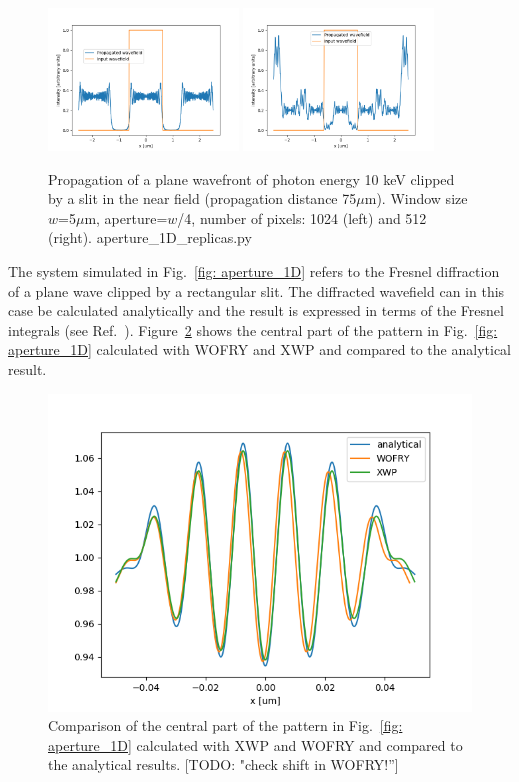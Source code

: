 \documentclass{iucr}              %
\newcommand{\todo}[1]{{\color{red}[TODO: "#1'']}}
\newcommand{\ingreen}[1]{{\color{green}#1}}
\begin{document}
\begin{figure}
\label{fig: aperture_1D_replica}
\caption{Propagation of a plane wavefront of photon energy 10 keV clipped by a slit in the near field (propagation distance 75$\mu$m). Window size $w$=5$\mu$m, aperture=$w$/4, number of pixels: 1024 (left) and 512 (right). \ingreen{aperture\_1D\_replicas.py}
}
\includegraphics[width=0.45\textwidth]{aperture_1D_over2.png}
\includegraphics[width=0.45\textwidth]{aperture_1D_over4.png}
\end{figure}


The system simulated in Fig.~\ref{fig: aperture_1D} refers to  the Fresnel diffraction of a plane wave clipped by a rectangular slit. The diffracted wavefield can in this case be calculated analytically and the result is expressed in terms of the Fresnel integrals (see Ref.~\cite{goodmanfourier}).  Figure~\ref{fig: aperture_1D_analytical} shows the central part of the pattern in Fig.~\ref{fig: aperture_1D} calculated with WOFRY and XWP and compared to the analytical result. 


\begin{figure}
\label{fig: aperture_1D_analytical}
\caption{Comparison of the central part of the pattern in Fig.~\ref{fig: aperture_1D} calculated with XWP and WOFRY and compared to the analytical results.
\todo{check shift in WOFRY!}
}
\includegraphics[width=1\textwidth]{aperture_1D_analytical.png}
\end{figure}
\end{document}
